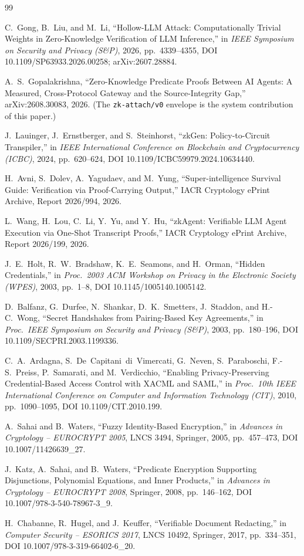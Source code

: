 \documentclass[10pt,journal,compsoc]{IEEEtran}
\begin{document}
\begin{thebibliography}{99}

C.~Gong, B.~Liu, and M.~Li, ``Hollow-LLM Attack: Computationally Trivial
Weights in Zero-Knowledge Verification of LLM Inference,'' in \emph{IEEE
Symposium on Security and Privacy (S\&P)}, 2026, pp.~4339--4355,
DOI 10.1109/SP63933.2026.00258; arXiv:2607.28884.

A.~S.~Gopalakrishna, ``Zero-Knowledge Predicate Proofs Between AI Agents: A
Measured, Cross-Protocol Gateway and the Source-Integrity Gap,''
arXiv:2608.30083, 2026. (The \texttt{zk-attach/v0} envelope is the system
contribution of this paper.)

J.~Lauinger, J.~Ernstberger, and S.~Steinhorst, ``zkGen: Policy-to-Circuit
Transpiler,'' in \emph{IEEE International Conference on Blockchain and
Cryptocurrency (ICBC)}, 2024, pp.~620--624,
DOI 10.1109/ICBC59979.2024.10634440.

H.~Avni, S.~Dolev, A.~Yagudaev, and M.~Yung, ``Super-intelligence Survival
Guide: Verification via Proof-Carrying Output,'' IACR Cryptology ePrint
Archive, Report 2026/994, 2026.

L.~Wang, H.~Lou, C.~Li, Y.~Yu, and Y.~Hu, ``zkAgent: Verifiable LLM Agent
Execution via One-Shot Transcript Proofs,'' IACR Cryptology ePrint Archive,
Report 2026/199, 2026.

J.~E.~Holt, R.~W.~Bradshaw, K.~E.~Seamons, and H.~Orman, ``Hidden
Credentials,'' in \emph{Proc.\ 2003 ACM Workshop on Privacy in the Electronic
Society (WPES)}, 2003, pp.~1--8, DOI 10.1145/1005140.1005142.

D.~Balfanz, G.~Durfee, N.~Shankar, D.~K.~Smetters, J.~Staddon, and H.-C.~Wong,
``Secret Handshakes from Pairing-Based Key Agreements,'' in \emph{Proc.\ IEEE
Symposium on Security and Privacy (S\&P)}, 2003, pp.~180--196,
DOI 10.1109/SECPRI.2003.1199336.

C.~A.~Ardagna, S.~De~Capitani~di~Vimercati, G.~Neven, S.~Paraboschi,
F.-S.~Preiss, P.~Samarati, and M.~Verdicchio, ``Enabling Privacy-Preserving
Credential-Based Access Control with XACML and SAML,'' in \emph{Proc.\ 10th
IEEE International Conference on Computer and Information Technology (CIT)},
2010, pp.~1090--1095, DOI 10.1109/CIT.2010.199.

A.~Sahai and B.~Waters, ``Fuzzy Identity-Based Encryption,'' in \emph{Advances
in Cryptology -- EUROCRYPT 2005}, LNCS 3494, Springer, 2005, pp.~457--473,
DOI 10.1007/11426639\_27.

J.~Katz, A.~Sahai, and B.~Waters, ``Predicate Encryption Supporting
Disjunctions, Polynomial Equations, and Inner Products,'' in \emph{Advances in
Cryptology -- EUROCRYPT 2008}, Springer, 2008, pp.~146--162,
DOI 10.1007/978-3-540-78967-3\_9.

H.~Chabanne, R.~Hugel, and J.~Keuffer, ``Verifiable Document Redacting,'' in
\emph{Computer Security -- ESORICS 2017}, LNCS 10492, Springer, 2017,
pp.~334--351, DOI 10.1007/978-3-319-66402-6\_20.

\end{thebibliography}
\end{document}
